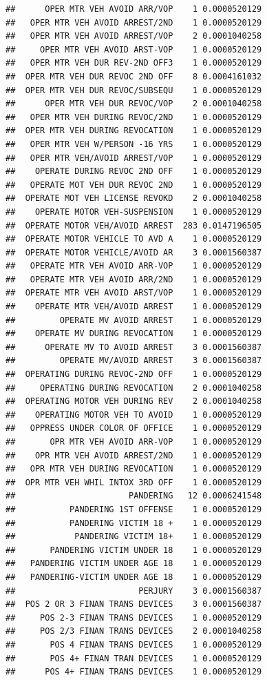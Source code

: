 \documentclass[]{book}
\begin{document}
\begin{verbatim}
##      OPER MTR VEH AVOID ARR/VOP    1 0.0000520129
##   OPER MTR VEH AVOID ARREST/2ND    1 0.0000520129
##   OPER MTR VEH AVOID ARREST/VOP    2 0.0001040258
##     OPER MTR VEH AVOID ARST-VOP    1 0.0000520129
##   OPER MTR VEH DUR REV-2ND OFF3    1 0.0000520129
##  OPER MTR VEH DUR REVOC 2ND OFF    8 0.0004161032
##  OPER MTR VEH DUR REVOC/SUBSEQU    1 0.0000520129
##      OPER MTR VEH DUR REVOC/VOP    2 0.0001040258
##   OPER MTR VEH DURING REVOC/2ND    1 0.0000520129
##  OPER MTR VEH DURING REVOCATION    1 0.0000520129
##   OPER MTR VEH W/PERSON -16 YRS    1 0.0000520129
##   OPER MTR VEH/AVOID ARREST/VOP    1 0.0000520129
##    OPERATE DURING REVOC 2ND OFF    1 0.0000520129
##   OPERATE MOT VEH DUR REVOC 2ND    1 0.0000520129
##  OPERATE MOT VEH LICENSE REVOKD    2 0.0001040258
##    OPERATE MOTOR VEH-SUSPENSION    1 0.0000520129
##  OPERATE MOTOR VEH/AVOID ARREST  283 0.0147196505
##  OPERATE MOTOR VEHICLE TO AVD A    1 0.0000520129
##  OPERATE MOTOR VEHICLE/AVOID AR    3 0.0001560387
##   OPERATE MTR VEH AVOID ARR-VOP    1 0.0000520129
##   OPERATE MTR VEH AVOID ARR/2ND    1 0.0000520129
##  OPERATE MTR VEH AVOID ARST/VOP    1 0.0000520129
##    OPERATE MTR VEH/AVOID ARREST    1 0.0000520129
##         OPERATE MV AVOID ARREST    1 0.0000520129
##    OPERATE MV DURING REVOCATION    1 0.0000520129
##      OPERATE MV TO AVOID ARREST    3 0.0001560387
##         OPERATE MV/AVOID ARREST    3 0.0001560387
##  OPERATING DURING REVOC-2ND OFF    1 0.0000520129
##     OPERATING DURING REVOCATION    2 0.0001040258
##  OPERATING MOTOR VEH DURING REV    2 0.0001040258
##    OPERATING MOTOR VEH TO AVOID    1 0.0000520129
##   OPPRESS UNDER COLOR OF OFFICE    1 0.0000520129
##       OPR MTR VEH AVOID ARR-VOP    1 0.0000520129
##    OPR MTR VEH AVOID ARREST/2ND    1 0.0000520129
##   OPR MTR VEH DURING REVOCATION    1 0.0000520129
##  OPR MTR VEH WHIL INTOX 3RD OFF    1 0.0000520129
##                       PANDERING   12 0.0006241548
##           PANDERING 1ST OFFENSE    1 0.0000520129
##           PANDERING VICTIM 18 +    1 0.0000520129
##            PANDERING VICTIM 18+    1 0.0000520129
##       PANDERING VICTIM UNDER 18    1 0.0000520129
##   PANDERING VICTIM UNDER AGE 18    1 0.0000520129
##   PANDERING-VICTIM UNDER AGE 18    1 0.0000520129
##                         PERJURY    3 0.0001560387
##  POS 2 OR 3 FINAN TRANS DEVICES    3 0.0001560387
##     POS 2-3 FINAN TRANS DEVICES    1 0.0000520129
##     POS 2/3 FINAN TRANS DEVICES    2 0.0001040258
##       POS 4 FINAN TRANS DEVICES    1 0.0000520129
##       POS 4+ FINAN TRAN DEVICES    1 0.0000520129
##      POS 4+ FINAN TRANS DEVICES    1 0.0000520129

\end{verbatim}
\end{document}
